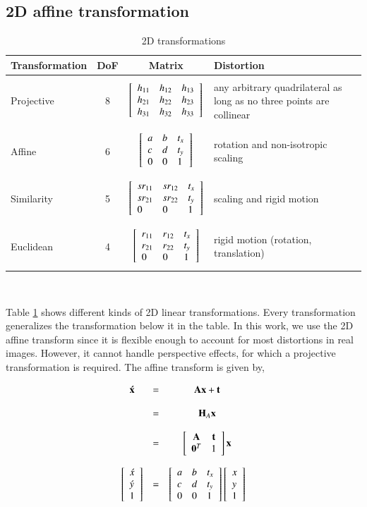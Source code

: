 \documentclass[12pt,letterpaper,doublespaced,ETD]{gt-ece-thesis} %
\begin{document}
\begin{Body}
\section{2D affine transformation}
\begin{table}[htp]
\centering
\begin{tabular}{| l | c | c | p{2.5in} |}
\hline
Transformation & DoF & Matrix & Distortion\\ \hline 
& & & \\ Projective & 8 & $\left[ \begin{array}{lll} h_{11} & h_{12} & h_{13} \\ h_{21} & h_{22} & h_{23} \\ h_{31} & h_{32} & h_{33} \\ \end{array} \right]$ & any arbitrary quadrilateral as long as no three points are collinear\\  & & & \\ \hline
& & & \\ Affine & 6 & $\left[ \begin{array}{lll} a &b & t_x \\ c & d & t_y \\ 0 & 0 & 1 \\ \end{array} \right]$ & rotation and non-isotropic scaling\\  & & & \\ \hline
& & & \\ Similarity & 5 & $\left[ \begin{array}{lll} sr_{11} & sr_{12} & t_x \\ sr_{21} & sr_{22} & t_y \\ 0 & 0 & 1 \\ \end{array} \right]$ & scaling and rigid motion\\  & & & \\ \hline
& & & \\ Euclidean & 4 & $\left[ \begin{array}{lll} r_{11} & r_{12} & t_x \\ r_{21} & r_{22} & t_y \\ 0 & 0 & 1 \\ \end{array} \right]$ & rigid motion (rotation, translation) \\  & & & \\ \hline
\end{tabular}\
\caption{2D transformations}
\label{table:2Dtransformations}
\end{table}


Table \ref{table:2Dtransformations} shows different kinds of 2D linear transformations.  Every transformation generalizes the transformation below it in the table.  In this work, we use the 2D affine transform since it is flexible enough to account for most distortions in real images.  However, it cannot handle perspective effects, for which a projective transformation is required. The affine transform is given by,

\begin{equation}
\begin{array}{cccc}
\mathbf{\acute{x}} &=& \mathbf{A}\mathbf{x} + \mathbf{t}\\\\
&=&\mathbf{H}_A \mathbf{x}\\\\
&=& \left[\begin{array}{cccc}\mathbf{A} & \mathbf{t}\\\mathbf{0}^T & 1\end{array}\right] \mathbf{x}\\\\
\left[\begin{array}{l}\acute{x}\\\acute{y}\\1\end{array}\right]   &=& \left[ \begin{array}{lll} a &b & t_x \\ c & d & t_y \\ 0 & 0 & 1 \\ \end{array} \right] \left[\begin{array}{l}x\\y\\1\end{array}\right]
\end{array}
\end{equation}


\end{Body}
\end{document}
